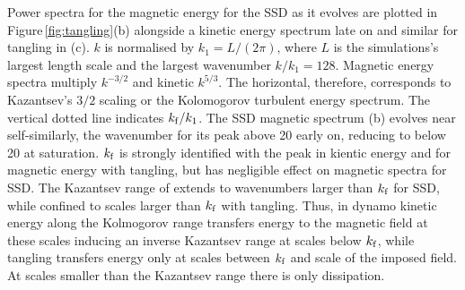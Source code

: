 \documentclass[preprint2]{aastex63}
\newcommand\kf{k_{\rm f} }
\begin{document}
 Power spectra for the magnetic energy for the SSD as it evolves are plotted
 in Figure\,\ref{fig:tangling}(b) alongside a kinetic energy spectrum late on
 and similar for tangling in (c).
 $k$ is normalised by $k_1=L/(2\pi)$, where $L$ is the simulations's largest
 length scale and the largest wavenumber $k/k_1=128$.
 Magnetic energy spectra multiply $k^{-3/2}$ and kinetic $k^{5/3}$.
 The horizontal, therefore, corresponds to Kazantsev's $3/2$ scaling
 \citep{Sch02,BS14} or the Kolomogorov turbulent energy spectrum.
 The vertical dotted line indicates $\kf/k_1$.
 The SSD magnetic spectrum (b) evolves near self-similarly, the wavenumber for
 its peak above 20 early on, reducing to below 20 at saturation.
 $\kf$ is strongly identified with the peak in kientic energy and for 
 magnetic energy with tangling, but has negligible effect on magnetic
 spectra for SSD.
 The Kazantsev range of extends to wavenumbers larger than $\kf$ for SSD, while
 confined to scales larger than $\kf$ with tangling.
 Thus, in dynamo kinetic energy along the Kolmogorov range transfers energy to
 the magnetic field at these scales inducing an inverse Kazantsev range
 at scales below $\kf$, while tangling transfers energy only at scales between
 $\kf$ and scale of the imposed field.
 At scales smaller than the Kazantsev range there is only dissipation. 
 
\end{document}
